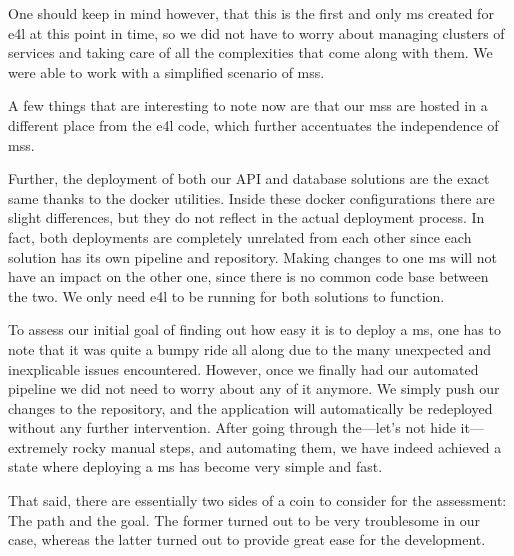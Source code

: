One should keep in mind however, that this is the first and only
\gls{ms} created for \gls{e4l} at this point in time, so we did not
have to worry about managing clusters of services and taking care of
all the complexities that come along with them. We were able to work
with a simplified scenario of \glspl{ms}.


A few things that are interesting to note now are that our \glspl{ms}
are hosted in a different place from the \gls{e4l} code, which further
accentuates the independence of \glspl{ms}.

Further, the deployment of both our API and database solutions are the
exact same thanks to the docker utilities. Inside these docker
configurations there are slight differences, but they do not reflect
in the actual deployment process. In fact, both deployments are
completely unrelated from each other since each solution has its
own pipeline and repository. Making changes to one \gls{ms} will not
have an impact on the other one, since there is no common code base
between the two. We only need \gls{e4l} to be running for both
solutions to function.


To assess our initial goal of finding out how easy it is to deploy a
\gls{ms}, one has to note that it was quite a bumpy ride all along due
to the many unexpected and inexplicable issues encountered. However,
once we finally had our automated pipeline we did not need to worry
about any of it anymore. We simply push our changes to the repository,
and the application will automatically be redeployed without any
further intervention. After going through the---let's not hide
it---extremely rocky manual steps, and
automating them, we have indeed achieved a state where deploying a
\gls{ms} has become very simple and fast.

That said, there are essentially two sides of a coin to consider for
the assessment: The path and the goal. The former turned out to be
very troublesome in our case, whereas the latter turned out to provide
great ease for the development.
